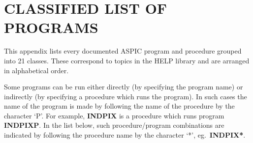 \section {CLASSIFIED LIST OF PROGRAMS}

This appendix lists every documented ASPIC program and procedure grouped into 21
classes.
These correspond to topics in the HELP library and are arranged in alphabetical
order.

Some programs can be run either directly (by specifying the program name) or
indirectly (by specifying a procedure which runs the program).
In such cases the name of the program is made by following the name of the
procedure by the character `P'.
For example, {\bf INDPIX} is a procedure which runs program {\bf INDPIXP}.
In the list below, such procedure/program combinations are indicated by
following the procedure name by the character `*', eg.\ {\bf INDPIX*}.
